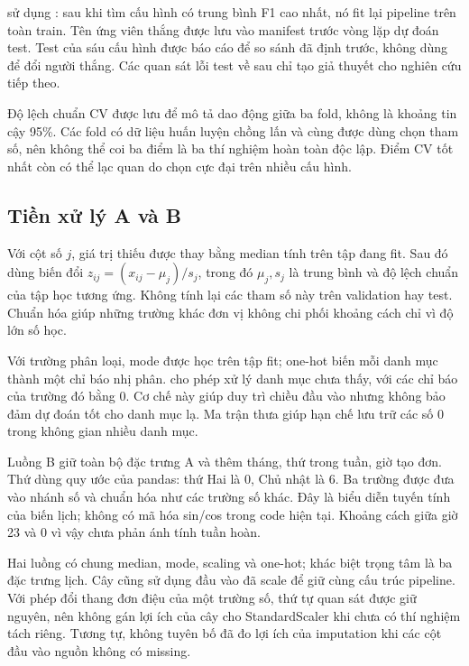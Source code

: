  sử dụng : sau khi tìm cấu hình có
trung bình F1 cao nhất, nó fit lại pipeline trên toàn train. Tên ứng viên
thắng được lưu vào manifest trước vòng lặp dự đoán test. Test của sáu cấu
hình được báo cáo để so sánh đã định trước, không dùng để đổi người thắng.
Các quan sát lỗi test về sau chỉ tạo giả thuyết cho nghiên cứu tiếp theo.

Độ lệch chuẩn CV được lưu để mô tả dao động giữa ba fold, không là khoảng
tin cậy 95\%. Các fold có dữ liệu huấn luyện chồng lấn và cùng được dùng
chọn tham số, nên không thể coi ba điểm là ba thí nghiệm hoàn toàn độc lập.
Điểm CV tốt nhất còn có thể lạc quan do chọn cực đại trên nhiều cấu hình.

\subsection{Tiền xử lý A và B}
Với cột số $j$, giá trị thiếu được thay bằng median tính trên tập đang fit.
Sau đó dùng biến đổi $z_{ij}=(x_{ij}-\mu_j)/s_j$, trong đó $\mu_j,s_j$ là
trung bình và độ lệch chuẩn của tập học tương ứng. Không tính lại các tham
số này trên validation hay test. Chuẩn hóa giúp những trường khác đơn vị
không chi phối khoảng cách chỉ vì độ lớn số học.

Với trường phân loại, mode được học trên tập fit; one-hot biến mỗi danh mục
thành một chỉ báo nhị phân.  cho phép xử lý
danh mục chưa thấy, với các chỉ báo của trường đó bằng 0. Cơ chế này giúp
duy trì chiều đầu vào nhưng không bảo đảm dự đoán tốt cho danh mục lạ.
Ma trận thưa giúp hạn chế lưu trữ các số 0 trong không gian nhiều danh mục.

Luồng B giữ toàn bộ đặc trưng A và thêm tháng, thứ trong tuần, giờ tạo đơn.
Thứ dùng quy ước  của pandas: thứ Hai là 0, Chủ nhật là 6.
Ba trường được đưa vào nhánh số và chuẩn hóa như các trường số khác. Đây
là biểu diễn tuyến tính của biến lịch; không có mã hóa sin/cos trong code
hiện tại. Khoảng cách giữa giờ 23 và 0 vì vậy chưa phản ánh tính tuần hoàn.

Hai luồng có chung median, mode, scaling và one-hot; khác biệt trọng tâm
là ba đặc trưng lịch. Cây cũng sử dụng đầu vào đã scale để giữ cùng cấu
trúc pipeline. Với phép đổi thang đơn điệu của một trường số, thứ tự quan
sát được giữ nguyên, nên không gán lợi ích của cây cho StandardScaler khi
chưa có thí nghiệm tách riêng. Tương tự, không tuyên bố đã đo lợi ích của
imputation khi các cột đầu vào nguồn không có missing.

